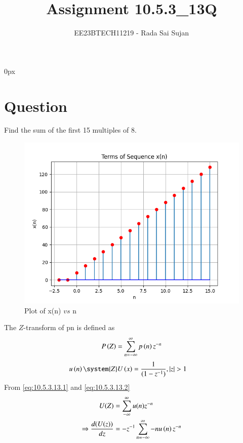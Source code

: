 \documentclass[journal,12pt,twocolumn]{IEEEtran}
\theoremstyle{remark}
\begin{document}
\parindent 0px

\title{Assignment 10.5.3\_13Q}
\author{EE23BTECH11219 - Rada Sai Sujan$^{}$%
}
\maketitle
\newpage
\bigskip
\section*{Question}
Find the sum of the first 15 multiples of 8. \\
\solution

    \begin{figure}[ht]
        \centering
        \includegraphics[width=\columnwidth]{figs/a.png}
        \caption{Plot of x(n) $vs$ n}
        \label{fig:10.5.3.13.1}
    \end{figure}
The $Z$-transform of p\brak n is defined as 
\begin{align}
    P\left(Z\right)=\sum\limits_{n=-\infty}^{\infty}p\left(n\right)z^{-n}         \label{eq:10.5.3.13.1}
\end{align}
\begin{align}
    u\brak{n} \system{Z} U\brak{x}&=\dfrac{1}{(1-{z}^{-1})}, |z|>1 \label{eq:10.5.3.13.2}
\end{align}
From \eqref{eq:10.5.3.13.1} and \eqref{eq:10.5.3.13.2}
\begin{align}
    U(Z)&=\sum\limits_{-\infty}^{\infty}u(n)z^{-n}   \\
    \Rightarrow \dfrac{d(U(z))}{dz} &= -z^{-1}\sum\limits_{n=-\infty}^{\infty}-nu\left(n\right)z^{-n}   
\end{align}
\end{document}
